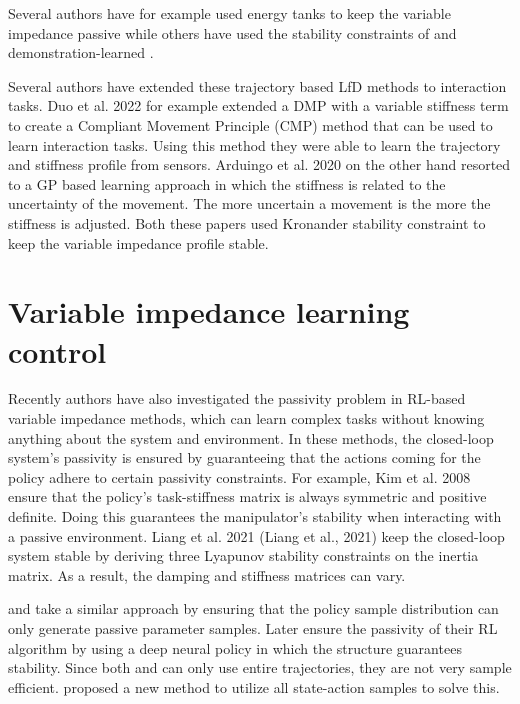 Several authors have for example used energy tanks to keep the variable impedance passive \cite{amanhoudForceAdaptationContact2020,enayatiVariableImpedanceForceControl2020,kastritsiProgressiveAutomationDMP2018,michelBilateralTeleoperationAdaptive2021,saverianoEnergybasedApproachEnsure2020,shahriariAdaptingContactsEnergy2017,wuFrameworkAutonomousImpedance2021,amanhoudDynamicalSystemApproach2019,kronanderPassiveInteractionControl2016} while others have used the stability constraints of and demonstration-learned \cite{arduengoGaussianProcessbasedRobotLearning2020,douRobotSkillLearning2022}.

Several authors have extended these trajectory based LfD methods to interaction tasks. Duo et al. 2022 for example \cite{douRobotSkillLearning2022} extended a DMP with a variable stiffness term to create a Compliant Movement Principle (CMP) method that can be used to learn interaction tasks. Using this method they were able to learn the trajectory and stiffness profile from sensors. Arduingo et al. 2020 on the other hand resorted to a GP based learning approach in which the stiffness is related to the uncertainty of the movement. The more uncertain a movement is the more the stiffness is adjusted. Both these papers used Kronander stability constraint to keep the variable impedance profile stable.


\section{Variable impedance learning control}

Recently authors have also investigated the passivity problem in RL-based variable impedance methods, which can learn complex tasks without knowing anything about the system and environment. In these methods, the closed-loop system's passivity is ensured by guaranteeing that the actions coming for the policy adhere to certain passivity constraints. For example, Kim et al. 2008 \cite{kimLearningRobotStiffness2008} ensure that the policy's task-stiffness matrix is always symmetric and positive definite. Doing this guarantees the manipulator's stability when interacting with a passive environment. Liang et al. 2021 (Liang et al., 2021) keep the closed-loop system stable by deriving three Lyapunov stability constraints on the inertia matrix. As a result, the damping and stiffness matrices can vary.

\cite{reyLearningMotionsDemonstrations2018} and \cite{khaderStabilityGuaranteedReinforcementLearning2020} take a similar approach by ensuring that the policy sample distribution can only generate passive parameter samples. Later \cite{khaderLearningDeepEnergy2021} ensure the passivity of their RL algorithm by using a deep neural policy in which the structure guarantees stability. Since both \cite{khaderStabilityGuaranteedReinforcementLearning2020,reyLearningMotionsDemonstrations2018} and \cite{khaderLearningDeepEnergy2021}can only use entire trajectories, they are not very sample efficient. \cite{khaderLearningStableNormalizingFlow2021} proposed a new method to utilize all state-action samples to solve this.

